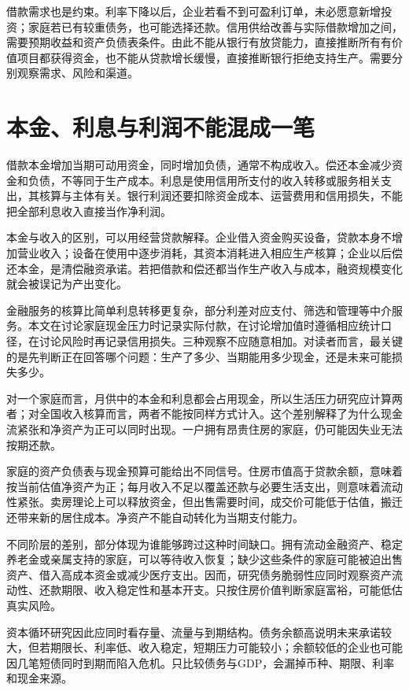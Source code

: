 \documentclass[UTF8,fontset=fandol,zihao=-4,oneside,openany]{ctexbook}
\begin{document}
借款需求也是约束。利率下降以后，企业若看不到可盈利订单，未必愿意新增投资；家庭若已有较重债务，也可能选择还款。信用供给改善与实际借款增加之间，需要预期收益和资产负债表条件。由此不能从银行有放贷能力，直接推断所有有价值项目都获得资金，也不能从贷款增长缓慢，直接推断银行拒绝支持生产。需要分别观察需求、风险和渠道。

\section{本金、利息与利润不能混成一笔}
借款本金增加当期可动用资金，同时增加负债，通常不构成收入。偿还本金减少资金和负债，不等同于生产成本。利息是使用信用所支付的收入转移或服务相关支出，其核算与主体有关。银行利润还要扣除资金成本、运营费用和信用损失，不能把全部利息收入直接当作净利润。

\label{arg:P100}
本金与收入的区别，可以用经营贷款解释。企业借入资金购买设备，贷款本身不增加营业收入；设备在使用中逐步消耗，其资本消耗进入相应生产核算；企业以后偿还本金，是清偿融资承诺。若把借款和偿还都当作生产收入与成本，融资规模变化就会被误记为产出变化。

金融服务的核算比简单利息转移更复杂，部分利差对应支付、筛选和管理等中介服务。本文在讨论家庭现金压力时记录实际付款，在讨论增加值时遵循相应统计口径，在讨论风险时再记录信用损失。三种观察不应随意相加。对读者而言，最关键的是先判断正在回答哪个问题：生产了多少、当期能用多少现金，还是未来可能损失多少。

对一个家庭而言，月供中的本金和利息都会占用现金，所以生活压力研究应计算两者；对全国收入核算而言，两者不能按同样方式计入。这个差别解释了为什么现金流紧张和净资产为正可以同时出现。一户拥有昂贵住房的家庭，仍可能因失业无法按期还款。

\label{arg:P101}
家庭的资产负债表与现金预算可能给出不同信号。住房市值高于贷款余额，意味着按当前估值净资产为正；每月收入不足以覆盖还款与必要生活支出，则意味着流动性紧张。卖房理论上可以释放资金，但出售需要时间，成交价可能低于估值，搬迁还带来新的居住成本。净资产不能自动转化为当期支付能力。

不同阶层的差别，部分体现为谁能够跨过这种时间缺口。拥有流动金融资产、稳定养老金或亲属支持的家庭，可以等待收入恢复；缺少这些条件的家庭可能被迫出售资产、借入高成本资金或减少医疗支出。因而，研究债务脆弱性应同时观察资产流动性、还款期限、收入稳定性和基本开支。只按住房价值判断家庭富裕，可能低估真实风险。

资本循环研究因此应同时看存量、流量与到期结构。债务余额高说明未来承诺较大，但若期限长、利率低、收入稳定，短期压力可能较小；余额较低的企业也可能因几笔短债同时到期而陷入危机。只比较债务与GDP，会漏掉币种、期限、利率和现金来源。
\end{document}
